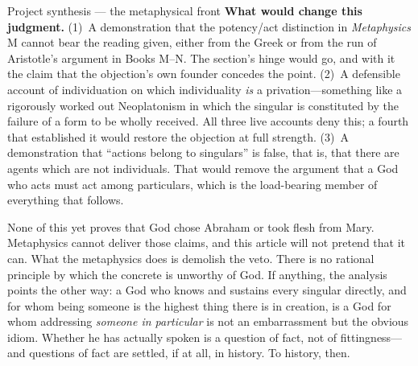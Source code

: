 \begin{studybox}{Project synthesis --- the metaphysical front}
\textbf{What would change this judgment.} (1)~A demonstration that the potency/act distinction in \emph{Metaphysics} M cannot bear the reading given, either from the Greek or from the run of Aristotle's argument in Books M--N. The section's hinge would go, and with it the claim that the objection's own founder concedes the point. (2)~A defensible account of individuation on which individuality \emph{is} a privation---something like a rigorously worked out Neoplatonism in which the singular is constituted by the failure of a form to be wholly received. All three live accounts deny this; a fourth that established it would restore the objection at full strength. (3)~A demonstration that ``actions belong to singulars'' is false, that is, that there are agents which are not individuals. That would remove the argument that a God who acts must act among particulars, which is the load-bearing member of everything that follows.
\end{studybox}

None of this yet proves that God chose Abraham or took flesh from Mary. Metaphysics cannot deliver those claims, and this article will not pretend that it can. What the metaphysics does is demolish the veto. There is no rational principle by which the concrete is unworthy of God. If anything, the analysis points the other way: a God who knows and sustains every singular directly, and for whom being someone is the highest thing there is in creation, is a God for whom addressing \emph{someone in particular} is not an embarrassment but the obvious idiom. Whether he has actually spoken is a question of fact, not of fittingness---and questions of fact are settled, if at all, in history. To history, then.
